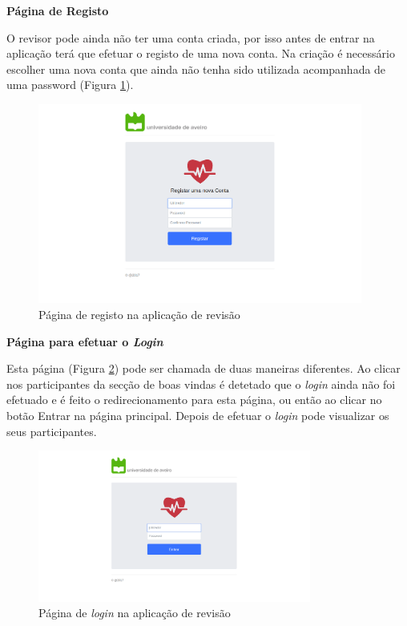 \par
\textbf{Página de Registo}
\par
O revisor pode ainda não ter uma conta criada, por isso antes de entrar na aplicação terá que efetuar o registo de uma nova conta. Na criação é necessário escolher uma nova conta que ainda não tenha sido utilizada acompanhada de uma password (Figura \ref{f:web-registo}).

\begin{figure}[H]
\centering
\includegraphics[width=0.95\textwidth]{imgs/signup_web.png}
\caption[Página de registo na aplicação de revisão]{Página de registo na aplicação de revisão}
\label{f:web-registo}
\end{figure}

\par
\textbf{Página para efetuar o \textit{Login}}
\par
Esta página (Figura \ref{f:web-login}) pode ser chamada de duas maneiras diferentes. Ao clicar nos participantes da secção de boas vindas é detetado que o \textit{login} ainda não foi efetuado e é feito o redirecionamento para esta página, ou então ao clicar no botão Entrar na página principal. Depois de efetuar o \textit{login} pode visualizar os seus participantes.

\begin{figure}[H]
\centering
\includegraphics[width=0.8\textwidth]{imgs/login_web.png}
\caption[Página de \textit{login} na aplicação de revisão]{Página de \textit{login} na aplicação de revisão}
\label{f:web-login}
\end{figure}

